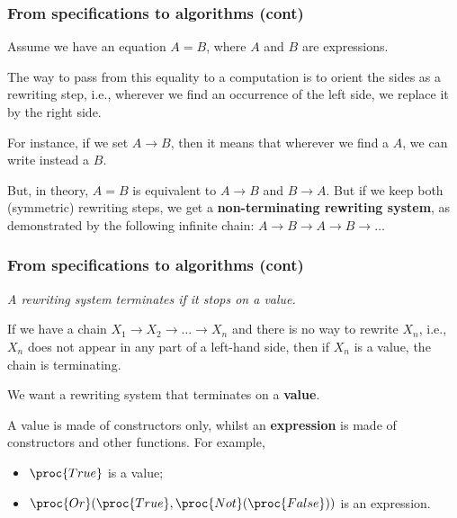 %
\begin{frame}
\frametitle{From specifications to algorithms (cont)}

Assume we have an equation \(A = B\), where \(A\) and \(B\) are
expressions. 

\bigskip

The way to pass from this equality to a computation is to orient the
sides as a rewriting step, i.e., wherever we find an occurrence of the
left side, we replace it by the right side.

\bigskip

For instance, if we set \(A \rightarrow B\), then it means that
wherever we find a \(A\), we can write instead a \(B\).

\bigskip

But, in theory, \(A = B\) is equivalent to \(A \rightarrow B\) and \(B
\rightarrow A\). But if we keep both (symmetric) rewriting steps, we
get a \textbf{non-terminating rewriting system}, as demonstrated by
the following infinite chain: \(A \rightarrow B \rightarrow A
\rightarrow B \rightarrow \dots\)

\end{frame}

%
\begin{frame}
\frametitle{From specifications to algorithms (cont)}

\emph{A rewriting system terminates if it stops on a value.}

\bigskip

If we have a chain \(X_1 \rightarrow X_2 \rightarrow \dots \rightarrow
X_n\) and there is no way to rewrite \(X_n\), i.e., \(X_n\) does not
appear in any part of a left-hand side, then if \(X_n\) is a value,
the chain is terminating.

\bigskip

We want a rewriting system that terminates on a \textbf{value}.

\bigskip

A value is made of constructors only, whilst an \textbf{expression} is
made of constructors and other functions. For example,

\begin{itemize}
 
  \item \(\proc{True}\) is a value;

  \item \(\proc{Or} (\proc{True}, \proc{Not} (\proc{False}))\) is an
  expression.

\end{itemize}

\end{frame}

